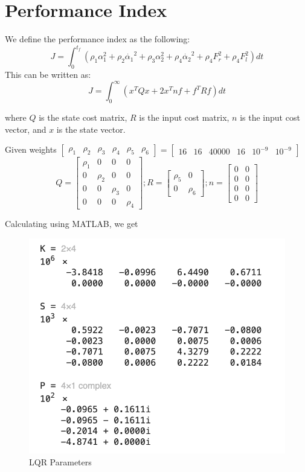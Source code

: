 \documentclass[12pt, a4paper, oneside]{report}
\begin{document}
\section{Performance Index}

We define the performance index as the following:
\begin{equation}
    J = \int_{0}^{t_f} \left( \rho_1 \alpha_1^2 + \rho_2 \dot{\alpha_1}^2 + \rho_3 \alpha_2^2 + \rho_4 \dot{\alpha_2}^2 + \rho_4 F_r^2 + \rho_4 F_l^2  \right) dt
\end{equation}
This can be written as:
\begin{equation}
    J = \int_{0}^{\infty} \left( x^T Q x + 2 x^T n f + f^T R f \right) dt
\end{equation}

where $Q$ is the state cost matrix, $R$ is the input cost matrix, $n$ is the input cost vector, and $x$ is the state vector.

Given weights $\begin{bmatrix}
    \rho_1 & \rho_2 & \rho_3 & \rho_4 & \rho_5 & \rho_6
\end{bmatrix} = \begin{bmatrix}
    16 & 16 & 40000 & 16 & 10^{-9} & 10^{-9}
\end{bmatrix}$
\begin{equation*}
    Q = \begin{bmatrix}
        \rho_1 & 0 & 0 & 0 \\
        0 & \rho_2 & 0 & 0 \\
        0 & 0 & \rho_3 & 0 \\
        0 & 0 & 0 & \rho_4
    \end{bmatrix} ;
    R = \begin{bmatrix}
        \rho_5 & 0 \\
        0 & \rho_6
    \end{bmatrix} ;
    n = \begin{bmatrix}
        0 & 0 \\
        0 & 0 \\
        0 & 0 \\
        0 & 0
    \end{bmatrix}
\end{equation*}

Calculating using MATLAB, we get

\begin{figure}[h]
    \centering
    \includegraphics[width=0.5\linewidth]{images/Q4_LQR.png}
    \caption{LQR Parameters}
    \label{fig:Q4_LQR}
\end{figure}
\end{document}
